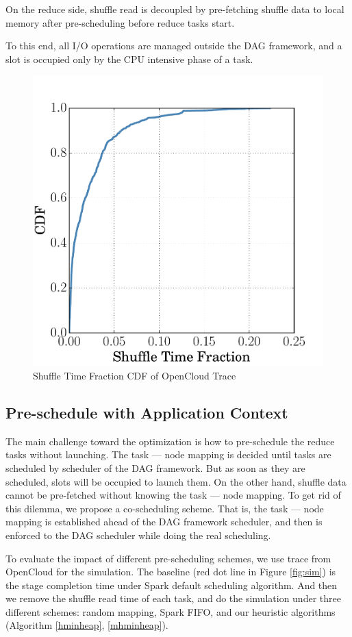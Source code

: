 On the reduce side, shuffle read is decoupled by pre-fetching shuffle data to local memory after pre-scheduling before reduce tasks start.

To this end, all I/O operations are managed outside the DAG framework, and a slot is occupied only by the CPU intensive phase of a task.

\begin{figure}
	\centering
	\includegraphics[width=0.75\linewidth]{fig/reduce_cdf}
	\caption{Shuffle Time Fraction CDF of OpenCloud Trace}
	\label{fig:cdf}
\end{figure}

\subsection{Pre-schedule with Application Context}
The main challenge toward the optimization is how to pre-schedule the reduce tasks without launching. The task --- node mapping is decided until tasks are scheduled by scheduler of the DAG framework. But as soon as they are scheduled, slots will be occupied to launch them. On the other hand, shuffle data cannot be pre-fetched without knowing the task --- node mapping.
To get rid of this dilemma, we propose a co-scheduling scheme. That is, the task --- node mapping is established ahead of the DAG framework scheduler, and then is enforced to the DAG scheduler while doing the real scheduling.

To evaluate the impact of different pre-scheduling schemes, we use trace from OpenCloud \cite{opencloudtrace} for the simulation. The baseline (red dot line in Figure \ref{fig:sim}) is the stage completion time under Spark default scheduling algorithm. And then we remove the shuffle read time of each task, and do the simulation under three different schemes: random mapping, Spark FIFO, and our heuristic algorithms (Algorithm \ref{hminheap}, \ref{mhminheap}).

